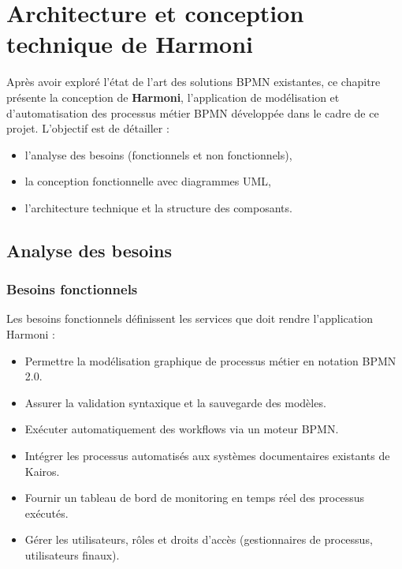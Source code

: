 \chapter{Architecture et conception technique de Harmoni}
\label{ch:conception_harmoni}

Après avoir exploré l'état de l'art des solutions BPMN existantes, ce chapitre présente la conception de \textbf{Harmoni}, l'application de modélisation et d'automatisation des processus métier BPMN développée dans le cadre de ce projet. 
L'objectif est de détailler :
\begin{itemize}
    \item l'analyse des besoins (fonctionnels et non fonctionnels),
    \item la conception fonctionnelle avec diagrammes UML,
    \item l'architecture technique et la structure des composants.
\end{itemize}

\section{Analyse des besoins}

\subsection{Besoins fonctionnels}
Les besoins fonctionnels définissent les services que doit rendre l'application Harmoni :
\begin{itemize}
    \item Permettre la modélisation graphique de processus métier en notation BPMN 2.0.
    \item Assurer la validation syntaxique et la sauvegarde des modèles.
    \item Exécuter automatiquement des workflows via un moteur BPMN.
    \item Intégrer les processus automatisés aux systèmes documentaires existants de Kairos.
    \item Fournir un tableau de bord de monitoring en temps réel des processus exécutés.
    \item Gérer les utilisateurs, rôles et droits d’accès (gestionnaires de processus, utilisateurs finaux).
\end{itemize}


